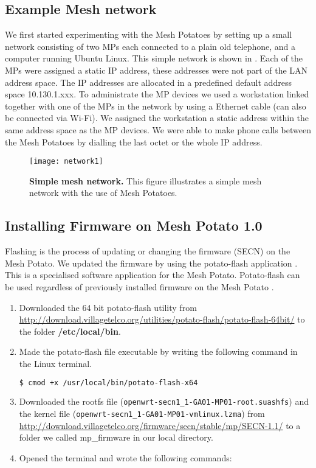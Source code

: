 \subsection{Example Mesh network}
We first started experimenting with the Mesh Potatoes by setting up a small network consisting of two MPs each connected to a plain old telephone, and a computer running Ubuntu Linux. This simple network is shown in . Each of the MPs were assigned a static IP address, these addresses were not part of the LAN address space. The IP addresses are allocated in a predefined default address space 10.130.1.xxx. To administrate the MP devices we used a workstation linked together with one of the MPs in the network by using a Ethernet cable (can also be connected via Wi-Fi). We assigned the workstation a static address within the same address space as the MP devices. We were able to make phone calls between the Mesh Potatoes by dialling the last octet or the whole IP address.

\begin{figure}[t]
  \centering
      \texttt{[image: network1]}
  \caption [Example of a simple mesh network]{\textbf{Simple mesh network.} This figure illustrates a simple mesh network with the use of Mesh Potatoes.}
  \label{fig:network}
\end{figure}


\subsection{Installing Firmware on Mesh Potato 1.0}

Flashing is the process of updating or changing the firmware (SECN) on the Mesh Potato. We updated the firmware by using the potato-flash application \cite{flashing}. This is a specialised software application for the Mesh Potato. Potato-flash can be used regardless of previously installed firmware on the Mesh Potato \cite{InstallingSecnFirmware}. 

\begin{enumerate}
\item Downloaded the 64 bit potato-flash utility from \url{http://download.villagetelco.org/utilities/potato-flash/potato-flash-64bit/} to the folder \textbf{/etc/local/bin}.
\item Made the potato-flash file executable by writing the following command in the Linux terminal.
\begin{lstlisting}[language=bash]
  $ cmod +x /usr/local/bin/potato-flash-x64
\end{lstlisting}
\item Downloaded the rootfs file (\texttt{openwrt-secn1_1-GA01-MP01-root.suashfs}) and the kernel file (\texttt{openwrt-secn1_1-GA01-MP01-vmlinux.lzma})  from \url{http://download.villagetelco.org/firmware/secn/stable/mp/SECN-1.1/} to a folder we called mp\_firmware in our local directory.
\item Opened the terminal and wrote the following commands: 
\end{enumerate}


